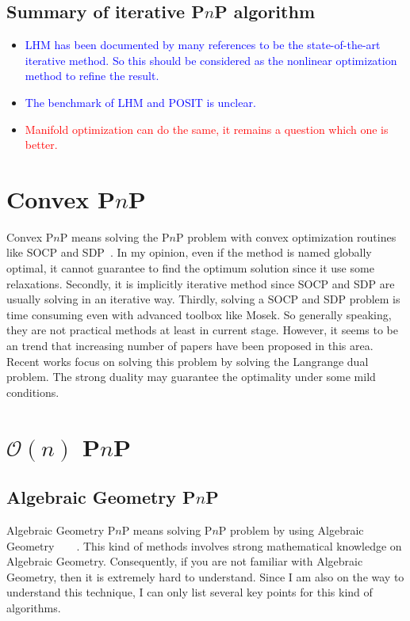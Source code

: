 \documentclass[a4paper]{article}
\begin{document}
\subsection{Summary of iterative P$n$P algorithm}
\begin{itemize}
\item \textcolor{blue}{LHM has been documented by many references to be the state-of-the-art iterative method. So this should be considered as the nonlinear optimization method to refine the result.}
\item \textcolor{blue}{The benchmark of LHM and POSIT is unclear.}
\item \textcolor{red}{Manifold optimization can do the same, it remains a question which one is better.}
\end{itemize}

\section{Convex P$n$P}
Convex P$n$P means solving the P$n$P problem with convex optimization routines like SOCP and SDP~\cite{schweighofer2008globally}. In my opinion, even if the method is named globally optimal, it cannot guarantee to find the optimum solution since it use some relaxations. Secondly, it is implicitly iterative method since SOCP and SDP are usually solving in an iterative way. Thirdly, solving a SOCP and SDP problem is time consuming even with advanced toolbox like Mosek. So generally speaking, they are not practical methods at least in current stage. However, it seems to be an trend that increasing number of papers have been proposed in this area. Recent works focus on solving this problem by solving the Langrange dual problem. The strong duality may guarantee the optimality under some mild conditions.

\section{$\mathcal{O}(n)$ P$n$P}
\subsection{Algebraic Geometry P$n$P}
Algebraic Geometry P$n$P means solving P$n$P problem by using Algebraic Geometry~\cite{zheng2013revisiting}~\cite{hesch2011direct}~\cite{kneip2014upnp}~\cite{zheng2013aspnp}\cite{triggs1999camera}. This kind of methods involves strong mathematical knowledge on Algebraic Geometry. Consequently, if you are not familiar with Algebraic Geometry, then it is extremely hard to understand. Since I am also on the way to understand this technique, I can only list several key points for this kind of algorithms.
\end{document}
